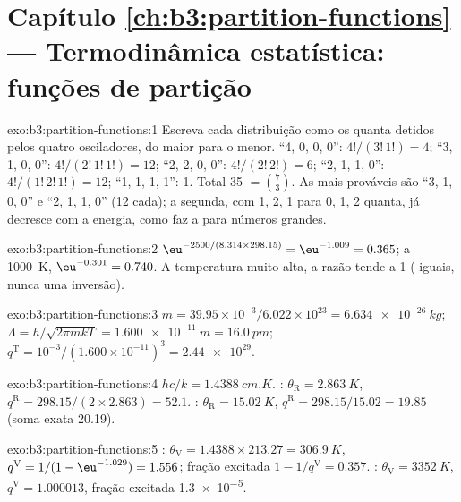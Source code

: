 \section*{Capítulo \ref{ch:b3:partition-functions} --- Termodinâmica estatística: funções de partição}

\begin{solution}{exo:b3:partition-functions:1}
Escreva cada distribuição como os quanta detidos pelos quatro osciladores, do
maior para o menor. ``4, 0, 0, 0'': $4!/(3!\,1!) = 4$; ``3, 1, 0, 0'': $4!/(2!\,1!\,1!) = 12$; ``2, 2, 0, 0'':
$4!/(2!\,2!) = 6$; ``2, 1, 1, 0'': $4!/(1!\,2!\,1!) = 12$; ``1, 1, 1, 1'': 1. Total 35 $= \binom73$.
As mais prováveis são ``3, 1, 0, 0'' e ``2, 1, 1, 0'' (12 cada); a segunda, com
 1, 2, 1 para 0, 1, 2 quanta, já decresce com a energia, como faz a
 para números grandes.
\end{solution}

\begin{solution}{exo:b3:partition-functions:2}
$\eu^{-2500/(8.314 \times 298.15)} = \eu^{-1.009} = 0.365$; a \qty{1000}{K}, $\eu^{-0.301} = 0.740$. A temperatura
muito alta, a razão tende a 1 ( iguais, nunca uma inversão).
\end{solution}

\begin{solution}{exo:b3:partition-functions:3}
$m = 39.95\times10^{-3}/6.022\times10^{23} = \qty{6.634e-26}{kg}$; $\Lambda = h/\sqrt{2\pi mkT} =
\qty{1.600e-11}{m} = \qty{16.0}{pm}$; $q^{\mathrm T} = 10^{-3}/(1.600\times10^{-11})^3 = \num{2.44e29}$.
\end{solution}

\begin{solution}{exo:b3:partition-functions:4}
$hc/k = \qty{1.4388}{cm.K}$. : $\theta_{\mathrm R} = \qty{2.863}{K}$, $q^{\mathrm R} = 298.15/(2 \times 2.863) = 52.1$.
: $\theta_{\mathrm R} = \qty{15.02}{K}$, $q^{\mathrm R} = 298.15/15.02 = 19.85$ (soma exata 20.19).
\end{solution}

\begin{solution}{exo:b3:partition-functions:5}
: $\theta_{\mathrm V} = 1.4388 \times 213.27 = \qty{306.9}{K}$, $q^{\mathrm V} = 1/(1 - \eu^{-1.029}) = 1.556$;
fração excitada $1 - 1/q^{\mathrm V} = 0.357$. : $\theta_{\mathrm V} = \qty{3352}{K}$, $q^{\mathrm V} = 1.000013$,
fração excitada \num{1.3e-5}.
\end{solution}

